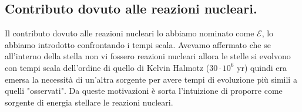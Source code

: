 \subsection{Contributo dovuto alle reazioni nucleari.}%
\label{sub:Contributo dovuto alle reazioni nucleari.}
Il contributo dovuto alle reazioni nucleari lo abbiamo nominato come $\mathcal{E}$, lo abbiamo introdotto confrontando i tempi scala. Avevamo affermato che se all'interno della stella non vi fossero reazioni nucleari allora le stelle si evolvono con tempi scala dell'ordine di quello di Kelvin Halmotz ($30 \cdot 10^{6}$ yr) quindi era emersa la necessità di un'altra sorgente per avere tempi di evoluzione più simili a quelli "osservati". Da queste motivazioni è sorta l'intuizione di proporre come sorgente di energia stellare le reazioni nucleari.\\

